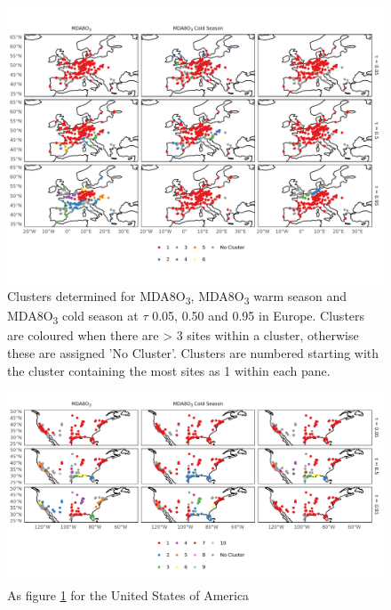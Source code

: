 \documentclass[journal abbreviation, manuscript]{copernicus}
\begin{document}
\begin{figure}
    \centering
    \includegraphics[width=\textwidth]{figures/paper_figures/f11_eu_clusters.pdf}
    \caption{Clusters determined for MDA8O\textsubscript{3}, MDA8O\textsubscript{3} warm season and MDA8O\textsubscript{3} cold season at $\tau$ 0.05, 0.50 and 0.95 in Europe. Clusters are coloured when there are > 3 sites within a cluster, otherwise these are assigned 'No Cluster'. Clusters are numbered starting with the cluster containing the most sites as 1 within each pane.}
    \label{fig:eu_cluster}
\end{figure}

\clearpage

\begin{figure}
    \centering
    \includegraphics[width=\textwidth]{figures/paper_figures/f12_us_clusters.pdf}
    \caption{As figure \ref{fig:eu_cluster} for the United States of America}
    \label{fig:us_cluster}
\end{figure}
\end{document}
